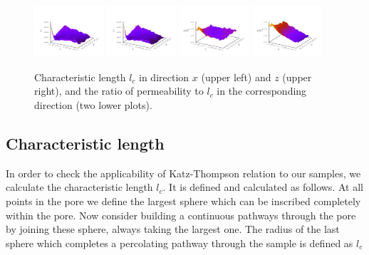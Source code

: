 \documentclass[aps,twocolumn,superscriptaddress,showpacs,showkeys]{revtex4}
\begin{document}
\begin{figure}[h]
\begin{center}
\includegraphics*[width=0.23\textwidth,angle=0]{data-figs/lc_x}
\includegraphics*[width=0.23\textwidth,angle=0]{data-figs/lc_z}
\includegraphics*[width=0.23\textwidth,angle=0]{data-figs/k_lc_x}
\includegraphics*[width=0.23\textwidth,angle=0]{data-figs/k_lc_z}
\caption{\protect
	Characteristic length $l_c$ in direction $x$ (upper left) and $z$ (upper right), and 
	the ratio of permeability to $l_c$ in the corresponding direction (two lower plots).
	}
\label{fig:lc}
\end{center}
\end{figure}

\subsection{Characteristic length}
\label{sec:lc}

In order to check the applicability of Katz-Thompson relation to our samples, 
we calculate the characteristic length $l_c$. It is defined and calculated as 
follows. At all points in the pore we define the largest sphere which can be inscribed 
completely within the pore. Now consider building a continuous pathways through the pore 
by joining these sphere, always taking the largest one. The radius of the last sphere 
which completes a percolating pathway through the sample is defined as $l_c$
\end{document}
